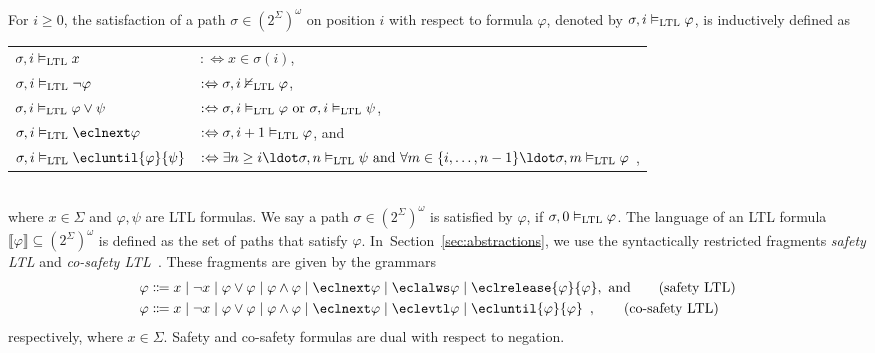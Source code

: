 \documentclass{LMCS}
\newcommand{\modelsltl}{\vDash_\text{\rm LTL}}
\newcommand{\nmodelsltl}{\nvDash_\text{\rm LTL}}
\theoremstyle{plain}\newtheorem{theorem}[thm]{Theorem}
\theoremstyle{plain}\newtheorem{lemma}[thm]{Lemma}
\theoremstyle{plain}\newtheorem{proposition}[thm]{Proposition}
\theoremstyle{plain}\newtheorem{corollary}[thm]{Corollary}
\theoremstyle{definition}\newtheorem{definition}{Definition}[section]
\begin{document}
For $i \geq 0$, the satisfaction of a path $\sigma \in (2^\Sigma)^\omega$ on position $i$ with respect to formula $\varphi$, denoted by $\sigma,i \modelsltl \varphi$, is inductively defined as\smallskip\\
\begin{tabular}{L l}
  $\sigma,i \modelsltl x$ & $:\Leftrightarrow x \in \sigma(i)$, \\[1pt]
  $\sigma,i \modelsltl \neg\varphi$ & $:\Leftrightarrow \sigma,i \nmodelsltl \varphi$, \\[1pt]
  $\sigma,i \modelsltl \varphi \lor \psi$ & $:\Leftrightarrow \sigma,i \modelsltl \varphi \text{ or } \sigma,i \modelsltl \psi$, \\[1pt]
  $\sigma,i \modelsltl \eclnext\varphi$ & $:\Leftrightarrow \sigma,i+1 \modelsltl \varphi$, and \\[1pt]
  $\sigma,i \modelsltl \ecluntil{\varphi}{\psi}$ & $:\Leftrightarrow \exists n \geq i \ldot \sigma,n \modelsltl \psi \text{ and } \forall m \in \{i,\ldots,n-1\} \ldot \sigma,m \modelsltl \varphi$ \enspace,
\end{tabular}\smallskip\\
where $x \in \Sigma$ and $\varphi, \psi$ are LTL formulas.
We say a path $\sigma \in (2^\Sigma)^\omega$ is satisfied by $\varphi$, if $\sigma,0 \modelsltl \varphi$.
The language of an LTL formula $\llbracket \varphi \rrbracket \subseteq (2^\Sigma)^\omega$ is defined as the set of paths that satisfy $\varphi$.
In~Section~\ref{sec:abstractions}, we use the syntactically restricted fragments \emph{safety LTL} and \emph{co-safety LTL}~\cite{DBLP:journals/fmsd/KupfermanV01}.
These fragments are given by the grammars
\begin{align*}
\varphi &\Coloneqq x \mid \neg x \mid \varphi \lor \varphi \mid \varphi \land \varphi \mid \eclnext \varphi \mid \eclalws \varphi \mid \eclrelease{\varphi}{\varphi}, \text{ and} \tag{safety LTL} \label{eq:safety_ltl_syntax} \\
\varphi &\Coloneqq x \mid \neg x \mid \varphi \lor \varphi \mid \varphi \land \varphi \mid \eclnext \varphi \mid \eclevtl \varphi \mid \ecluntil{\varphi}{\varphi} \enspace, \tag{co-safety LTL} \label{eq:co-safety_ltl_syntax}
\end{align*}
respectively, where $x \in \Sigma$.
Safety and co-safety formulas are dual with respect to negation.
\end{document}
